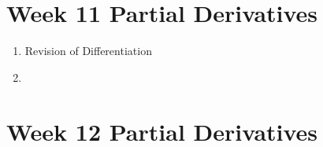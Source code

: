 \documentclass[]{article}
\begin{document}
\section{Week 11 Partial Derivatives}

\begin{enumerate}
\item Revision of Differentiation
\item 
\end{enumerate}
\newpage
\section{Week 12 Partial Derivatives}
\end{document}
